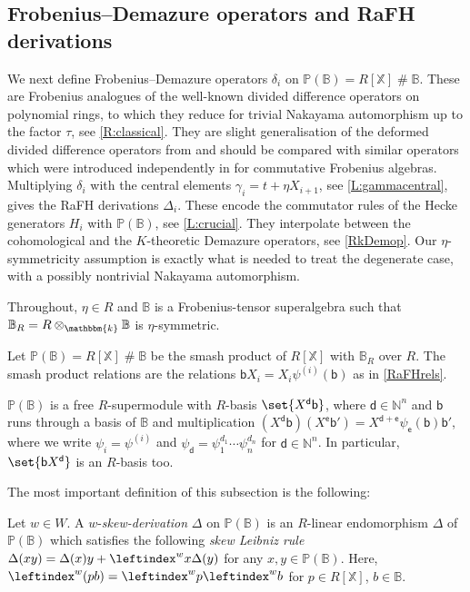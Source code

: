 \documentclass[a4paper,11pt]{amsart}
\numberwithin{equation}{subsection}
\theoremstyle{definition}
\theoremstyle{theorem}
\theoremstyle{remark}
\newcommand\Sym{W}
\newcommand\bd{\mathsf{d}}
\newcommand\bb{\mathsf{b}}
\newcommand\be{\mathsf{e}}
\newcommand\Po{\mathbb{P}(\mathbb{B})}
\newcommand\N{\mathbb{N}}
\newcommand\X{\mathbb{X}}
\newcommand\kk{\mathbbm{k}}
\newcommand\RR{R}
\newcommand{\Bo}{\mathbb{B}}
\DeclareMathOperator\Smash{\#}
\begin{document}
\subsection{Frobenius--Demazure operators and RaFH derivations}\label{S:Demazures}
We next define Frobenius--Demazure operators $\delta_i$ on $\Po=R[\X]\Smash\Bo$. These are Frobenius
analogues of the well-known divided difference operators on polynomial rings, to which they reduce for trivial Nakayama
automorphism up to the factor $\tau$, see \autoref{R:classical}. They are slight
generalisation of the deformed divided difference operators from
\cite{Savage:AffineWreath,RossoSavage:QuantumAffineWreath} and should be compared with similar operators which were introduced independently in \cite{LaiMinets} for commutative Frobenius algebras. Multiplying
$\delta_i$ with the central elements $\gamma_i=t+\eta X_{i+1}$, see \autoref{L:gammacentral}, gives the RaFH derivations
$\Delta_i$. These encode the commutator rules of the Hecke generators $H_i$ with $\Po$, see
\autoref{L:crucial}. They interpolate between the cohomological and the
$K$-theoretic Demazure operators, see \autoref{RkDemop}. Our $\eta$-symmetricity
assumption is exactly what is needed to treat the degenerate case, with a possibly nontrivial
Nakayama automorphism.

Throughout, $\eta\in\RR$ and $\Bo$ is a  Frobenius-tensor superalgebra such that $\Bo_\RR=\RR\otimes_\kk\Bo$ is $\eta$-symmetric.

\begin{Definition}\label{DefPo}
   Let $\Po=R[\X]\Smash\Bo$ be the smash product of $R[\X]$ with $\Bo_\RR$ over $\RR$. The smash product relations are the relations $\bb X_i=X_i\psi^{(i)}(\bb)$ as in  \autoref{RaFHrels}.
   \end{Definition}
   \begin{Remark} $\Po$ is a free $R$-supermodule with $R$-basis
  $\set{X^\bd\bb}$, where $\bd\in\N^n$ and $\bb$ runs through a basis of $\Bo$ and multiplication $(X^\bd\bb)(X^\be\bb')=X^{\bd+\be}\psi_\be(\bb)\bb'$,
   where we write $\psi_i=\psi^{(i)}$ and $\psi_\bd=\psi_1^{d_1}\cdots\psi_n^{d_n}$ for $\bd\in\N^n$. In particular, $\set{\bb X^\bd}$ is an $R$-basis too.
  \end{Remark}

The most important definition of this subsection is the following:
\begin{Definition}\label{skewDer}
Let $w\in\Sym$.  A $w$-\emph{skew-derivation} $\Delta$ on $\Po$ is an $R$-linear endomorphism $\Delta$ of $\Po$ which satisfies the following  \emph{skew Leibniz rule}
$\Delta(xy)=\Delta(x)y+\leftindex^{w}x\Delta(y)$ for any $x, y\in\Po$. Here, $\leftindex^{w}(pb)=\leftindex^{w}p\leftindex^{w}b$ for $p\in R[\X]$, $b\in\Bo$.
\end{Definition}
\end{document}
